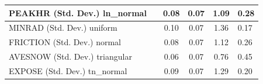 \begin{table}
\begin{center}
\begin{tabular}{|l|l|c|c|c|l|}
			\hline
			PEAKHR (Std. Dev.) ln_normal &  & 0.08 & 0.07 & 1.09 & 0.28 \\
			\hline
			MINRAD (Std. Dev.) uniform &  & 0.10 & 0.07 & 1.36 & 0.17 \\
			\hline
			FRICTION (Std. Dev.) normal &  & 0.08 & 0.07 & 1.12 & 0.26 \\
			\hline
			AVESNOW (Std. Dev.) triangular &  & 0.06 & 0.07 & 0.76 & 0.45 \\
			\hline
			EXPOSE (Std. Dev.) tn_normal &  & 0.09 & 0.07 & 1.29 & 0.20 \\
			\hline
		\end{tabular}
	\end{center}
\end{table}